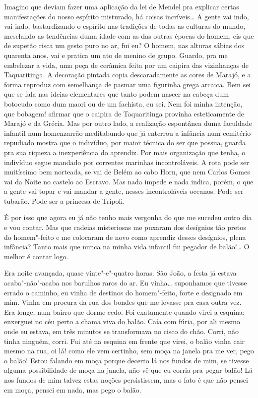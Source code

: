 Imagino que deviam fazer uma aplicação da lei de Mendel pra explicar
certas manifestações do nosso espírito misturado, há coisas incríveis\ldots{}
A gente vai indo, vai indo, bastardizando o espírito nas tradições de
todas as culturas do mundo, mesclando as tendências duma idade com as
das outras épocas do homem, eis que de supetão risca um gesto puro no
ar, fui eu? O homem, nas alturas sábias dos quarenta anos, vai e pratica
um ato de menino de grupo. Guardo, pra me embelezar a vida, uma peça de
cerâmica feita por um caipira das vizinhanças de Taquaritinga. A
decoração pintada copia descaradamente as cores de Marajó, e a forma
reproduz com semelhança de pasmar uma figurinha grega arcaica. Bem sei
que se fala nas ideias elementares que tanto podem nascer na cabeça dum
botocudo como dum maori ou de um fachista, eu sei. Nem foi minha
intenção, que bobagem! afirmar que o caipira de Taquaritinga provinha
esteticamente de Marajó e da Grécia. Mas por outro lado, a realização
espontânea duma faculdade infantil num homenzarrão meditabundo que já
enterrou a infância num cemitério repudiado mostra que o indivíduo, por
maior técnica do ser que possua, guarda pra sua riqueza a inexperiência
do aprendiz. Por mais organização que tenha, o indivíduo segue mandado
por correntes marinhas incontroláveis. A rota pode ser muitíssimo bem
norteada, se vai de Belém ao cabo Horn, que nem Carlos Gomes vai da
Noite no castelo ao Escravo. Mas nada impede e nada indica, porém, o que
a gente vai topar e vai mandar a gente, nesses incontroláveis oceanos.
Pode ser tubarão. Pode ser a princesa de Trípoli.

É por isso que agora eu já não tenho mais vergonha do que me sucedeu
outro dia e vou contar. Mas que cadeias misteriosas me puxaram dos
desígnios tão pretos do homem"-feito e me colocaram de novo como aprendiz
desses desígnios, plena infância? Tanto mais que nunca na minha vida
infantil fui pegador de balão!\ldots{} O melhor é contar logo.

Era noite avançada, quase vinte"-e"-quatro horas. São João, a festa já
estava acaba"-não"-acaba nos barulhos raros do ar. Eu vinha\ldots{} suponhamos
que tivesse errado o caminho, eu vinha de destinos do homem"-feito, forte
e designado em mim. Vinha em procura da rua dos bondes que me levasse
pra casa outra vez. Era longe, num bairro que dorme cedo. Foi exatamente
quando virei a esquina: enxerguei no céu perto a chama viva do balão.
Caía com fúria, por ali mesmo onde eu estava, em três minutos se
transformava no cisco do chão. Corri, não tinha ninguém, corri. Fui até
na esquina em frente que virei, o balão vinha cair mesmo na rua, oi lá!
como ele vem certinho, sem moça na janela pra me ver, pego o balão!
Estou falando em moça porque decerto lá nos fundos de mim, se tivesse
alguma possibilidade de moça na janela, não vê que eu corria pra pegar
balão! Lá nos fundos de mim talvez estas noções persistissem, mas o fato
é que não pensei em moça, pensei em nada, mas pego o balão.

